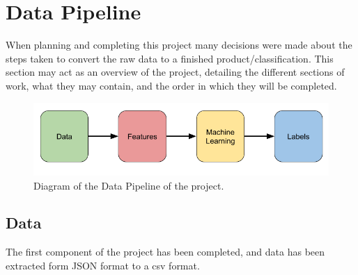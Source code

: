 \documentclass{article}
\begin{document}
\section{Data Pipeline}

When planning and completing this project many decisions were made about the steps taken to convert the raw data to a finished product/classification.
This section may act as an overview of the project, detailing the different sections of work, what they may contain, and the order in which they will be completed.

\begin{figure}[ht]
    \centering
    \includegraphics[scale=0.5]{Images/Data-Pipeline.png}
    \caption{Diagram of the Data Pipeline of the project.}
    \label{fig:test}
\end{figure}


\subsection{Data}



The first component of the project has been completed, and data has been extracted form JSON format to a csv format.
\end{document}
